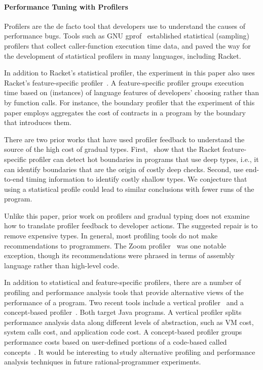\paragraph{Performance Tuning with Profilers} Profilers are the de facto
tool that developers use to understand the causes of performance bugs. 
Tools such as GNU gprof~\cite{gprof} established statistical (sampling) 
profilers that collect caller-function execution time data, and paved the
way for the development of statistical profilers in many languages,
including Racket.

In addition to Racket's statistical profiler, the experiment in this
paper also uses Racket's feature-specific
profiler~\cite{astavf-feature-prf, staaf-feature-prf}. A
feature-specific profiler
groups execution time based on (instances) of language features of
developers' choosing rather than by function calls.  For instance, the
boundary profiler that the experiment of this paper employs aggregates
the cost of contracts in a program by the boundary that introduces
them.

There are two prior works that have used profiler feedback to understand
the source of the high cost of gradual types.
First,~\citet{astavf-feature-prf} show that the Racket feature-specific profiler can detect
hot boundaries in programs that use deep types, i.e., it can
identify boundaries that are the origin of costly deep checks.
Second, \citet{grmhn-vmil-2019} use end-to-end timing information
to identify costly shallow types.
We conjecture that using a statistical profile could lead to similar
conclusions with fewer runs of the program.

Unlike this paper, prior work on profilers and gradual typing does not
examine how to translate profiler feedback to developer actions.
The suggested repair is to remove expensive types.
In general, most profiling tools do not make recommendations to
programmers. The Zoom profiler~\cite{zoom} was one
notable exception, though its recommendations were phrased in
terms of assembly language rather than high-level code.

In addition to statistical and feature-specific profilers, there are a
number of profiling and performance analysis tools that provide
alternative views of the performance of a program. Two recent tools include
a vertical profiler~\cite{vertical-profiler} and a
concept-based profiler~\cite{java-profile-concepts}.
Both target Java programs.
A vertical profiler splits performance analysis data   along different
levels of abstraction, such as VM cost, system calls cost, and application
code cost. A concept-based profiler groups performance costs based on
user-defined portions of a code-based called concepts~\cite{concepts}.
It would be interesting to study alternative profiling and performance
analysis techniques in future rational-programmer experiments.


